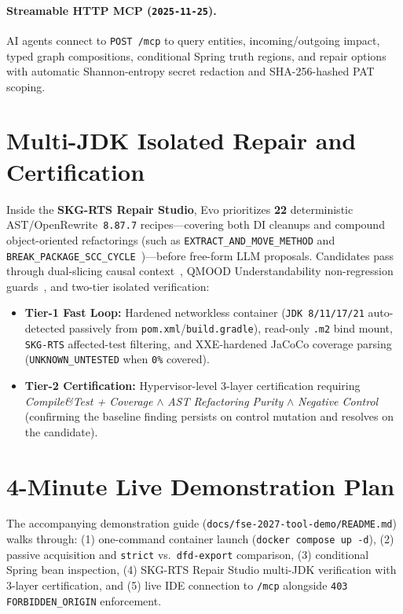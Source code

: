 \documentclass[sigconf,nonacm]{acmart}
\begin{document}
\paragraph{Streamable HTTP MCP (\texttt{2025-11-25}).} AI agents connect to \texttt{POST /mcp} to query entities, incoming/outgoing impact, typed graph compositions, conditional Spring truth regions, and repair options with automatic Shannon-entropy secret redaction and SHA-256-hashed PAT scoping.

\section{Multi-JDK Isolated Repair and Certification}
Inside the \textbf{SKG-RTS Repair Studio}, Evo prioritizes \textbf{22} deterministic AST/OpenRewrite~\texttt{8.87.7} recipes—covering both DI cleanups and compound object-oriented refactorings (such as \texttt{EXTRACT\_AND\_MOVE\_METHOD} and \texttt{BREAK\_PACKAGE\_SCC\_CYCLE}~\cite{swerefactor2026})—before free-form LLM proposals. Candidates pass through dual-slicing causal context~\cite{causalrepair2026}, QMOOD Understandability non-regression guards~\cite{refagent2026}, and two-tier isolated verification:
\begin{itemize}
  \item \textbf{Tier-1 Fast Loop:} Hardened networkless container (\texttt{JDK 8/11/17/21} auto-detected passively from \texttt{pom.xml}/\texttt{build.gradle}), read-only \texttt{.m2} bind mount, \texttt{SKG-RTS} affected-test filtering, and XXE-hardened JaCoCo coverage parsing (\texttt{UNKNOWN\_UNTESTED} when \texttt{0\%} covered).
  \item \textbf{Tier-2 Certification:} Hypervisor-level 3-layer certification requiring \textit{Compile\&Test + Coverage} $\land$ \textit{AST Refactoring Purity} $\land$ \textit{Negative Control} (confirming the baseline finding persists on control mutation and resolves on the candidate).
\end{itemize}

\section{4-Minute Live Demonstration Plan}
The accompanying demonstration guide (\texttt{docs/fse-2027-tool-demo/README.md}) walks through: (1) one-command container launch (\texttt{docker compose up -d}), (2) passive acquisition and \texttt{strict} vs.\ \texttt{dfd-export} comparison, (3) conditional Spring bean inspection, (4) SKG-RTS Repair Studio multi-JDK verification with 3-layer certification, and (5) live IDE connection to \texttt{/mcp} alongside \texttt{403 FORBIDDEN\_ORIGIN} enforcement.
\end{document}
